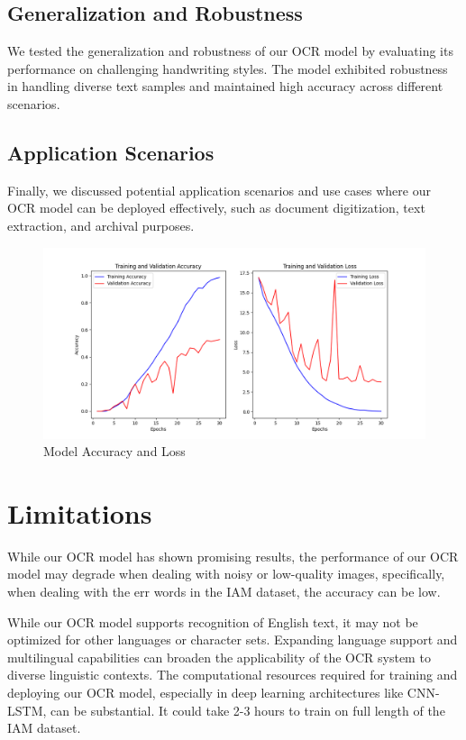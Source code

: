 \documentclass{article}
\begin{document}
\subsection{Generalization and Robustness}

We tested the generalization and robustness of our OCR model by evaluating its performance on challenging handwriting styles. The model exhibited robustness in handling diverse text samples and maintained high accuracy across different scenarios.

\subsection{Application Scenarios}

Finally, we discussed potential application scenarios and use cases where our OCR model can be deployed effectively, such as document digitization, text extraction, and archival purposes.

\begin{figure}
    \centering
    \includegraphics[width=1\linewidth]{Accuracy_Loss_Plot.png}
    \caption{Model Accuracy and Loss}
    \label{fig:loss}
\end{figure}


\section{Limitations}

While our OCR model has shown promising results, the performance of our OCR model may degrade when dealing with noisy or low-quality images, specifically, when dealing with the err words in the IAM dataset, the accuracy can be low.

While our OCR model supports recognition of English text, it may not be optimized for other languages or character sets. Expanding language support and multilingual capabilities can broaden the applicability of the OCR system to diverse linguistic contexts. The computational resources required for training and deploying our OCR model, especially in deep learning architectures like CNN-LSTM, can be substantial. It could take 2-3 hours to train on full length of the IAM dataset.
\end{document}
